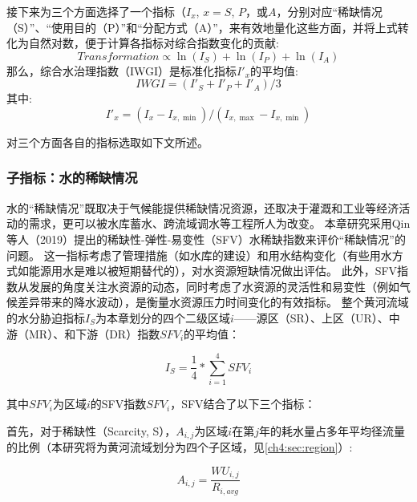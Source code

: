 接下来为三个方面选择了一个指标（$I_x$, $x=S$, $P$，或$A$，分别对应“稀缺情况（S）”、“使用目的（P）”和“分配方式（A）”，来有效地量化这些方面，并将上式转化为自然对数，便于计算各指标对综合指数变化的贡献:
\begin{equation}
    Transformation \propto \ln(I_S) + \ln(I_P) + \ln(I_A)
\end{equation}
那么，综合水治理指数（IWGI）是标准化指标$I'_x$的平均值:
\begin{equation}
    IWGI = (I'_S + I'_P + I'_A) / 3
    \label{ch4:eq:IWGI}
\end{equation}
其中:
\begin{equation}
    I'_x = (I_x - I_{x, \min}) / (I_{x, \max} - I_{x, \min})
\end{equation}

对三个方面各自的指标选取如下文所述。

\subsubsection{子指标：水的稀缺情况}

水的“稀缺情况”既取决于气候能提供稀缺情况资源，还取决于灌溉和工业等经济活动的需求，更可以被水库蓄水、跨流域调水等工程所人为改变\cite{qin2019,wada2014,huang2021}。
本章研究采用Qin等人（2019）提出的稀缺性-弹性-易变性（SFV）水稀缺指数来评价“稀缺情况”的问题\cite{qin2019}。
这一指标考虑了管理措施（如水库的建设）和用水结构变化（有些用水方式如能源用水是难以被短期替代的），对水资源短缺情况做出评估。
此外，SFV指数从发展的角度关注水资源的动态，同时考虑了水资源的灵活性和易变性（例如气候差异带来的降水波动），是衡量水资源压力\cite{qin2019}时间变化的有效指标。
整个黄河流域的水分胁迫指标$I_S$为本章划分的四个二级区域$i$——源区（SR）、上区（UR）、中游（MR）、和下游（DR）指数$SFV_{i}$的平均值：

\begin{equation}
    I_S = \frac{1}{4} * \sum_{i=1}^4 SFV_{i}
    \label{ch4:eq:scarcity}
\end{equation}

其中$SFV_i$为区域$i$的SFV指数$SFV_i$，SFV结合了以下三个指标：

首先，对于稀缺性（Scarcity, S），$A_{i, j}$为区域$i$在第$j$年的耗水量占多年平均径流量的比例（本研究将为黄河流域划分为四个子区域，见\ref{ch4:sec:region}）:

\begin{equation}
    A_{i, j} = \frac{WU_{i,j}}{R_{i, avg}}
\end{equation}

